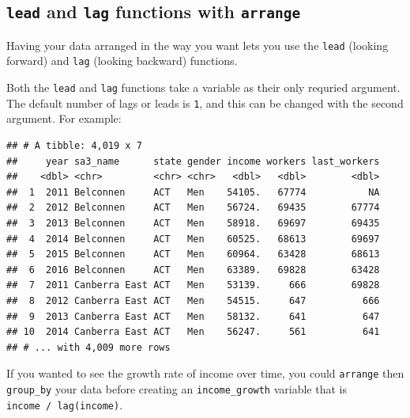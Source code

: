 \documentclass[]{book}
\newenvironment{Shaded}{\begin{snugshade}}{\end{snugshade}}
\newcommand{\DataTypeTok}[1]{\textcolor[rgb]{0.13,0.29,0.53}{#1}}
\newcommand{\DecValTok}[1]{\textcolor[rgb]{0.00,0.00,0.81}{#1}}
\newcommand{\KeywordTok}[1]{\textcolor[rgb]{0.13,0.29,0.53}{\textbf{#1}}}
\newcommand{\NormalTok}[1]{#1}
\newcommand{\OperatorTok}[1]{\textcolor[rgb]{0.81,0.36,0.00}{\textbf{#1}}}
\newcommand{\StringTok}[1]{\textcolor[rgb]{0.31,0.60,0.02}{#1}}
\begin{document}
\hypertarget{lead-and-lag-functions-with-arrange}{%
\subsection{\texorpdfstring{\texttt{lead} and \texttt{lag} functions with \texttt{arrange}}{lead and lag functions with arrange}}\label{lead-and-lag-functions-with-arrange}}

Having your data arranged in the way you want lets you use the \texttt{lead} (looking forward) and \texttt{lag} (looking backward) functions.

Both the \texttt{lead} and \texttt{lag} functions take a variable as their only requried argument. The default number of lags or leads is \texttt{1}, and this can be changed with the second argument. For example:

\begin{Shaded}
\end{Shaded}

\begin{verbatim}
## # A tibble: 4,019 x 7
##     year sa3_name      state gender income workers last_workers
##    <dbl> <chr>         <chr> <chr>   <dbl>   <dbl>        <dbl>
##  1  2011 Belconnen     ACT   Men    54105.   67774           NA
##  2  2012 Belconnen     ACT   Men    56724.   69435        67774
##  3  2013 Belconnen     ACT   Men    58918.   69697        69435
##  4  2014 Belconnen     ACT   Men    60525.   68613        69697
##  5  2015 Belconnen     ACT   Men    60964.   63428        68613
##  6  2016 Belconnen     ACT   Men    63389.   69828        63428
##  7  2011 Canberra East ACT   Men    53139.     666        69828
##  8  2012 Canberra East ACT   Men    54515.     647          666
##  9  2013 Canberra East ACT   Men    58132.     641          647
## 10  2014 Canberra East ACT   Men    56247.     561          641
## # ... with 4,009 more rows
\end{verbatim}

If you wanted to see the growth rate of income over time, you could \texttt{arrange} then \texttt{group\_by} your data before creating an \texttt{income\_growth} variable that is \texttt{income\ /\ lag(income)}.

\begin{Shaded}
\end{Shaded}
\end{document}
